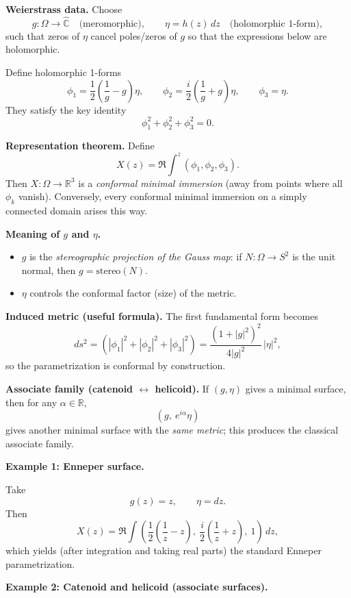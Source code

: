 \begin{solution}
	\medskip
	\textbf{Weierstrass data.}
	Choose
	\[
	g:\Omega\to\widehat{\mathbb{C}} \quad\text{(meromorphic)},\qquad
	\eta = h(z)\,dz \quad\text{(holomorphic 1-form)},
	\]
	such that zeros of $\eta$ cancel poles/zeros of $g$ so that the expressions below are holomorphic.
	
	Define holomorphic 1-forms
	\[
	\phi_1=\frac12\left(\frac{1}{g}-g\right)\eta,\qquad
	\phi_2=\frac{i}{2}\left(\frac{1}{g}+g\right)\eta,\qquad
	\phi_3=\eta.
	\]
	They satisfy the key identity
	\[
	\phi_1^2+\phi_2^2+\phi_3^2=0.
	\]
	
	\medskip
	\textbf{Representation theorem.}
	Define
	\[
	X(z)=\Re\int^z (\phi_1,\phi_2,\phi_3).
	\]
	Then $X:\Omega\to\mathbb{R}^3$ is a \emph{conformal minimal immersion} (away from points where all $\phi_k$ vanish).
	Conversely, every conformal minimal immersion on a simply connected domain arises this way.
	
	\medskip
	\textbf{Meaning of $g$ and $\eta$.}
	\begin{itemize}
		\item $g$ is the \emph{stereographic projection of the Gauss map}:
		if $N:\Omega\to S^2$ is the unit normal, then $g=\mathrm{stereo}(N)$.
		\item $\eta$ controls the conformal factor (size) of the metric.
	\end{itemize}
	
	\medskip
	\textbf{Induced metric (useful formula).}
	The first fundamental form becomes
	\[
	ds^2 = \left(|\phi_1|^2+|\phi_2|^2+|\phi_3|^2\right)
	= \frac{(1+|g|^2)^2}{4|g|^2}\,|\eta|^2,
	\]
	so the parametrization is conformal by construction.
	
	\medskip
	\textbf{Associate family (catenoid $\leftrightarrow$ helicoid).}
	If $(g,\eta)$ gives a minimal surface, then for any $\alpha\in\mathbb{R}$,
	\[
	(g,\ e^{i\alpha}\eta)
	\]
	gives another minimal surface with the \emph{same metric}; this produces the classical associate family.
	
	\bigskip
	\par\medskip\noindent\textbf{Example 1: Enneper surface.}\par\smallskip

	Take
	\[
	g(z)=z,\qquad \eta = dz.
	\]
	Then
	\[
	X(z)=\Re\int \left(\frac12\left(\frac{1}{z}-z\right),\ \frac{i}{2}\left(\frac{1}{z}+z\right),\ 1\right)\,dz,
	\]
	which yields (after integration and taking real parts) the standard Enneper parametrization.
	
	\bigskip
	\par\medskip\noindent\textbf{Example 2: Catenoid and helicoid (associate surfaces).}\par\smallskip


\end{solution}
